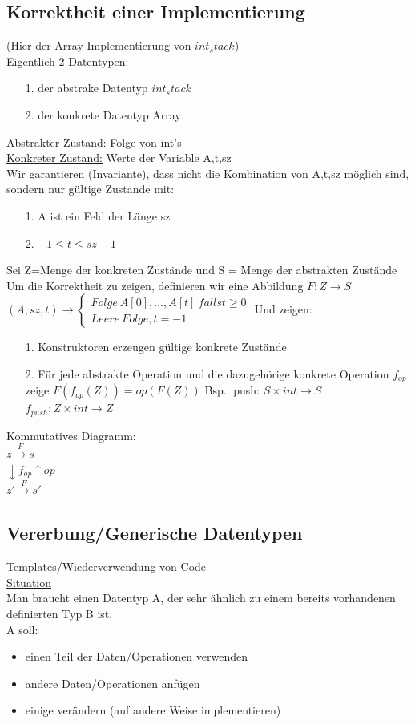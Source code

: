 \documentclass[a4paper]{article}
\begin{document}
\subsection*{Korrektheit einer Implementierung}
(Hier der Array-Implementierung von $int_stack$)\\
Eigentlich 2 Datentypen:
\begin{itemize}
\item[1.] der abstrake Datentyp $int_stack$
\item[2.] der konkrete Datentyp Array
\end{itemize}
\underline{Abstrakter Zustand:} Folge von int's\\
\underline{Konkreter Zustand:} Werte der Variable A,t,sz\\
Wir garantieren (Invariante), dass nicht die Kombination von A,t,sz möglich sind, sondern nur gültige Zustande mit:
\begin{itemize}
\item[1.]A ist ein Feld der Länge sz
\item[2.] $-1 \leq t\leq sz-1$
\end{itemize}
Sei Z=Menge der konkreten Zustände und S = Menge der abstrakten Zustände\\
Um die Korrektheit zu zeigen, definieren wir eine Abbildung $F: Z \rightarrow S$\\
$(A,sz,t) \rightarrow \left\lbrace \begin{array}{l}
	Folge\ A[0],...,A[t]\ falls t\geq 0\\
	Leere\ Folge, t=-1
\end{array}\right.$
Und zeigen:
\begin{itemize}
\item[1.] Konstruktoren erzeugen gültige konkrete Zustände
\item[2.] Für jede abstrakte Operation und die dazugehörige konkrete Operation $f_{op}$ zeige $F(f_{op}(Z)) = op(F(Z))$
	Bsp.: push: $S\times int \rightarrow S $\\
	$f_{push}: Z \times int \rightarrow Z$
\end{itemize}
Kommutatives Diagramm:\\
$z \xrightarrow{F} s$\\
$\downarrow f_{op} \uparrow op$\\
$z' \xrightarrow{F} s'$
\subsection*{Vererbung/Generische Datentypen}
Templates/Wiederverwendung von Code\\
\underline{Situation}\\
Man braucht einen Datentyp A, der sehr ähnlich zu einem bereits vorhandenen definierten Typ B ist.\\
A soll:\\
\begin{itemize}
\item einen Teil der Daten/Operationen verwenden
\item andere Daten/Operationen anfügen
\item einige verändern (auf andere Weise implementieren)
\end{itemize}
\end{document}
